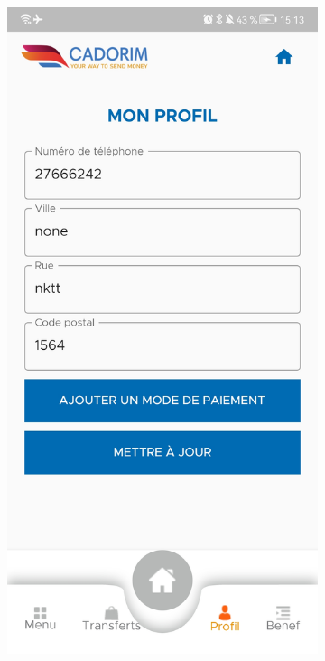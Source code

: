 \begin{itemize}[label=$\ast$]

\begin{figure}
	\centering
	\begin{subfigure}[b]{0.3\textwidth}
		\centering
		\includegraphics[width=\textwidth]{./Template LaTeX/Images/6.jpg}

\end{subfigure}
\end{figure}
\end{itemize}
